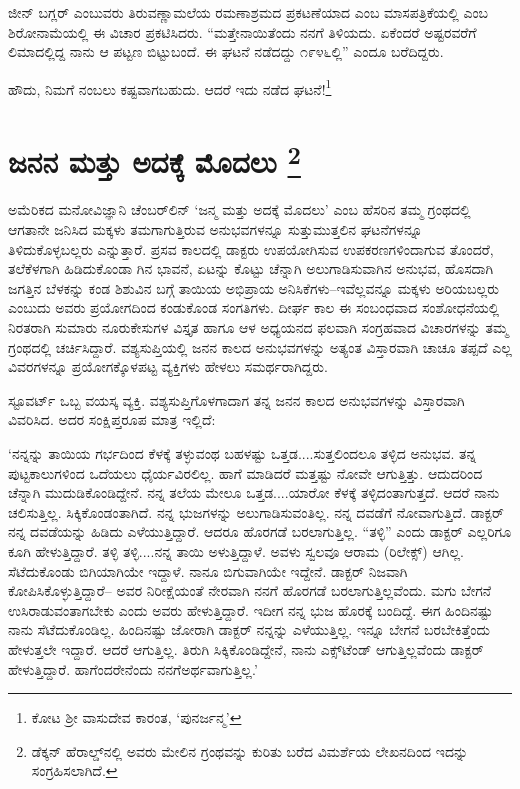 ಜೀನ್ ಬಗ್ಲರ್ ಎಂಬುವರು ತಿರುವಣ್ಣಾಮಲೆಯ ರಮಣಾಶ್ರಮದ ಪ್ರಕಟಣೆಯಾದ\break {} ಎಂಬ ಮಾಸಪತ್ರಿಕೆಯಲ್ಲಿ  ಎಂಬ ಶಿರೋನಾಮೆಯಲ್ಲಿ ಈ ವಿಚಾರ ಪ್ರಕಟಿಸಿದರು. “ಮತ್ತೇನಾಯಿತೆಂದು ನನಗೆ ತಿಳಿಯದು. ಏಕೆಂದರೆ ಅಷ್ಟರವರೆಗೆ ಲಿಮಾದಲ್ಲಿದ್ದ ನಾನು ಆ ಪಟ್ಟಣ ಬಿಟ್ಟುಬಂದೆ. ಈ ಘಟನೆ ನಡೆದದ್ದು ೧೯೪೬ಲ್ಲಿ” ಎಂದೂ ಬರೆದಿದ್ದರು.

ಹೌದು, ನಿಮಗೆ ನಂಬಲು ಕಷ್ಟವಾಗಬಹುದು. ಆದರೆ ಇದು ನಡೆದ ಘಟನೆ!\footnote{ ಕೋಟ ಶ‍್ರೀ ವಾಸುದೇವ ಕಾರಂತ, ‘ಪುನರ್ಜನ್ಮ’}


\section*{ಜನನ ಮತ್ತು ಅದಕ್ಕೆ ಮೊದಲು \protect\footnote{ ಡೆಕ್ಕನ್ ಹೆರಾಲ್ಡ್​ನಲ್ಲಿ  ಅವರು ಮೇಲಿನ ಗ್ರಂಥವನ್ನು ಕುರಿತು ಬರೆದ ವಿಮರ್ಶೆಯ ಲೇಖನದಿಂದ ಇದನ್ನು ಸಂಗ್ರಹಿಸಲಾಗಿದೆ.}}


ಅಮೆರಿಕದ ಮನೋವಿಜ್ಞಾನಿ ಚೆಂಬರ್​ಲಿನ್ ‘ಜನ್ಮ ಮತ್ತು ಅದಕ್ಕೆ ಮೊದಲು’ ಎಂಬ ಹೆಸರಿನ ತಮ್ಮ ಗ್ರಂಥದಲ್ಲಿ ಆಗತಾನೇ ಜನಿಸಿದ ಮಕ್ಕಳು ತಮಗಾಗುತ್ತಿರುವ ಅನುಭವಗಳನ್ನೂ ಸುತ್ತುಮುತ್ತಲಿನ ಘಟನೆಗಳನ್ನೂ ತಿಳಿದುಕೊಳ್ಳಬಲ್ಲರು ಎನ್ನುತ್ತಾರೆ. ಪ್ರಸವ ಕಾಲದಲ್ಲಿ ಡಾಕ್ಟರು ಉಪಯೋಗಿಸುವ ಉಪಕರಣಗಳಿಂದಾಗುವ ತೊಂದರೆ, ತಲೆಕೆಳಗಾಗಿ ಹಿಡಿದುಕೊಂಡಾ ಗಿನ ಭಾವನೆ, ಏಟನ್ನು ಕೊಟ್ಟು ಚೆನ್ನಾಗಿ ಅಲುಗಾಡಿಸುವಾಗಿನ ಅನುಭವ, ಹೊಸದಾಗಿ ಜಗತ್ತಿನ ಬೆಳಕನ್ನು ಕಂಡ ಶಿಶುವಿನ ಬಗ್ಗೆ ತಾಯಿಯ ಅಭಿಪ್ರಾಯ ಅನಿಸಿಕೆಗಳು–ಇವೆಲ್ಲವನ್ನೂ ಮಕ್ಕಳು ಅರಿಯಬಲ್ಲರು ಎಂಬುದು ಅವರು ಪ್ರಯೋಗದಿಂದ ಕಂಡುಕೊಂಡ ಸಂಗತಿಗಳು. ದೀರ್ಘ ಕಾಲ ಈ ಸಂಬಂಧವಾದ ಸಂಶೋಧನೆಯಲ್ಲಿ ನಿರತರಾಗಿ ಸುಮಾರು ನೂರುಕೇಸುಗಳ ವಿಸ್ತೃತ ಹಾಗೂ ಆಳ ಅಧ್ಯಯನದ ಫಲವಾಗಿ ಸಂಗ್ರಹವಾದ ವಿಚಾರಗಳನ್ನು ತಮ್ಮ ಗ್ರಂಥದಲ್ಲಿ ಚರ್ಚಿಸಿದ್ದಾರೆ. ವಶ್ಯಸುಪ್ತಿಯಲ್ಲಿ ಜನನ ಕಾಲದ ಅನುಭವಗಳನ್ನು ಅತ್ಯಂತ ವಿಸ್ತಾರವಾಗಿ ಚಾಚೂ ತಪ್ಪದೆ ಎಲ್ಲ ವಿವರಗಳನ್ನೂ ಪ್ರಯೋಗಕ್ಕೊಳಪಟ್ಟ ವ್ಯಕ್ತಿಗಳು ಹೇಳಲು ಸಮರ್ಥರಾಗಿದ್ದರು.

\newpage

ಸ್ಟೂವರ್ಟ್ ಒಬ್ಬ ವಯಸ್ಕ ವ್ಯಕ್ತಿ. ವಶ್ಯಸುಪ್ತಿಗೊಳಗಾದಾಗ ತನ್ನ ಜನನ ಕಾಲದ ಅನುಭವಗಳನ್ನು ವಿಸ್ತಾರವಾಗಿ ವಿವರಿಸಿದ. ಅದರ ಸಂಕ್ಷಿಪ್ತರೂಪ ಮಾತ್ರ ಇಲ್ಲಿದೆ:

‘ನನ್ನನ್ನು ತಾಯಿಯ ಗರ್ಭದಿಂದ ಕೆಳಕ್ಕೆ ತಳ್ಳುವಂಥ ಬಹಳಷ್ಟು ಒತ್ತಡ....ಸುತ್ತಲಿಂದಲೂ ತಳ್ಳಿದ ಅನುಭವ. ತನ್ನ ಪುಟ್ಟಕಾಲುಗಳಿಂದ ಒದೆಯಲು ಧೈರ್ಯವಿರಲಿಲ್ಲ. ಹಾಗೆ ಮಾಡಿದರೆ ಮತ್ತಷ್ಟು ನೋವೇ ಆಗುತ್ತಿತ್ತು. ಆದುದರಿಂದ ಚೆನ್ನಾಗಿ ಮುದುಡಿಕೊಂಡಿದ್ದೇನೆ. ನನ್ನ ತಲೆಯ ಮೇಲೂ ಒತ್ತಡ....ಯಾರೋ ಕೆಳಕ್ಕೆ ತಳ್ಳಿದಂತಾಗುತ್ತದೆ. ಆದರೆ ನಾನು ಚಲಿಸುತ್ತಿಲ್ಲ. ಸಿಕ್ಕಿಕೊಂಡಂ\-ತಾಗಿದೆ. ನನ್ನ ಭುಜಗಳನ್ನು ಅಲುಗಾಡಿಸುವಂತಿಲ್ಲ. ನನ್ನ ದವಡೆಗೆ ನೋವಾಗುತ್ತಿದೆ. ಡಾಕ್ಟರ್ ನನ್ನ ದವಡೆಯನ್ನು ಹಿಡಿದು ಎಳೆಯುತ್ತಿದ್ದಾರೆ. ಆದರೂ ಹೊರಗಡೆ ಬರಲಾಗುತ್ತಿಲ್ಲ. “ತಳ್ಳಿ” ಎಂದು ಡಾಕ್ಟರ್ ಎಲ್ಲರಿಗೂ ಕೂಗಿ ಹೇಳುತ್ತಿದ್ದಾರೆ. ತಳ್ಳಿ ತಳ್ಳಿ....ನನ್ನ ತಾಯಿ ಅಳುತ್ತಿದ್ದಾಳೆ. ಅವಳು ಸ್ವಲವೂ ಆರಾಮ (ರಿಲೇಕ್ಸ್​) ಆಗಿಲ್ಲ. ಸೆಟೆದುಕೊಂಡು ಬಿಗಿಯಾಗಿಯೇ ಇದ್ದಾಳೆ. ನಾನೂ ಬಿಗುವಾಗಿಯೇ ಇದ್ದೇನೆ. ಡಾಕ್ಟರ್ ನಿಜವಾಗಿ ಕೋಪಿಸಿಕೊಳ್ಳುತ್ತಿದ್ದಾರೆ– ಅವರ ನಿರೀಕ್ಷೆಯಂತೆ ನೇರವಾಗಿ ನನಗೆ ಹೊರಗಡೆ ಬರಲಾಗುತ್ತಿಲ್ಲವೆಂದು. ಮಗು ಬೇಗನೆ ಉಸಿರಾಡುವಂತಾಗಬೇಕು ಎಂದು ಅವರು ಹೇಳುತ್ತಿದ್ದಾರೆ. ಇದೀಗ ನನ್ನ ಭುಜ ಹೊರಕ್ಕೆ ಬಂದಿದ್ದೆ. ಈಗ ಹಿಂದಿನಷ್ಟು ನಾನು ಸೆಟೆದುಕೊಂಡಿಲ್ಲ. ಹಿಂದಿನಷ್ಟು ಜೋರಾಗಿ ಡಾಕ್ಟರ್ ನನ್ನನ್ನು ಎಳೆಯುತ್ತಿಲ್ಲ. ಇನ್ನೂ ಬೇಗನೆ ಬರಬೇಕಿತ್ತೆಂದು ಹೇಳುತ್ತಲೇ ಇದ್ದಾರೆ. ಆದರೆ ಆಗುತ್ತಿಲ್ಲ. ತಿರುಗಿ ಸಿಕ್ಕಿಕೊಂಡಿದ್ದೇನೆ, ನಾನು ಎಕ್ಸ್​ಟೆಂಡ್ ಆಗುತ್ತಿಲ್ಲವೆಂದು ಡಾಕ್ಟರ್ ಹೇಳುತ್ತಿದ್ದಾರೆ. ಹಾಗೆಂದರೇನೆಂದು ನನಗೆ\break ಅರ್ಥವಾಗುತ್ತಿಲ್ಲ.’

